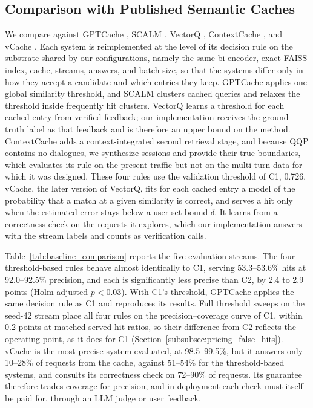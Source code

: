 \documentclass[authoryear,preprint,review,12pt]{elsarticle}
\begin{document}
\subsection{Comparison with Published Semantic Caches}
\label{subsec:baseline_comparison}
We compare against GPTCache \citep{bang2023gptcache}, SCALM \citep{li2024scalm}, VectorQ \citep{Schroeder2025VectorQ}, ContextCache \citep{Yan2025ContextCache}, and vCache \citep{schroeder2026vcache}. Each system is reimplemented at the level of its decision rule on the substrate shared by our configurations, namely the same bi-encoder, exact FAISS index, cache, streams, answers, and batch size, so that the systems differ only in how they accept a candidate and which entries they keep. GPTCache applies one global similarity threshold, and SCALM clusters cached queries and relaxes the threshold inside frequently hit clusters. VectorQ learns a threshold for each cached entry from verified feedback; our implementation receives the ground-truth label as that feedback and is therefore an upper bound on the method. ContextCache adds a context-integrated second retrieval stage, and because QQP contains no dialogues, we synthesize sessions and provide their true boundaries, which evaluates its rule on the present traffic but not on the multi-turn data for which it was designed. These four rules use the validation threshold of C1, 0.726. vCache, the later version of VectorQ, fits for each cached entry a model of the probability that a match at a given similarity is correct, and serves a hit only when the estimated error stays below a user-set bound $\delta$. It learns from a correctness check on the requests it explores, which our implementation answers with the stream labels and counts as verification calls.

Table~\ref{tab:baseline_comparison} reports the five evaluation streams. The four threshold-based rules behave almost identically to C1, serving 53.3--53.6\% hits at 92.0--92.5\% precision, and each is significantly less precise than C2, by 2.4 to 2.9 points (Holm-adjusted $p<0.03$). With C1's threshold, GPTCache applies the same decision rule as C1 and reproduces its results. Full threshold sweeps on the seed-42 stream place all four rules on the precision--coverage curve of C1, within 0.2 points at matched served-hit ratios, so their difference from C2 reflects the operating point, as it does for C1 (Section~\ref{subsubsec:pricing_false_hits}). vCache is the most precise system evaluated, at 98.5--99.5\%, but it answers only 10--28\% of requests from the cache, against 51--54\% for the threshold-based systems, and consults its correctness check on 72--90\% of requests. Its guarantee therefore trades coverage for precision, and in deployment each check must itself be paid for, through an LLM judge or user feedback.
\end{document}
